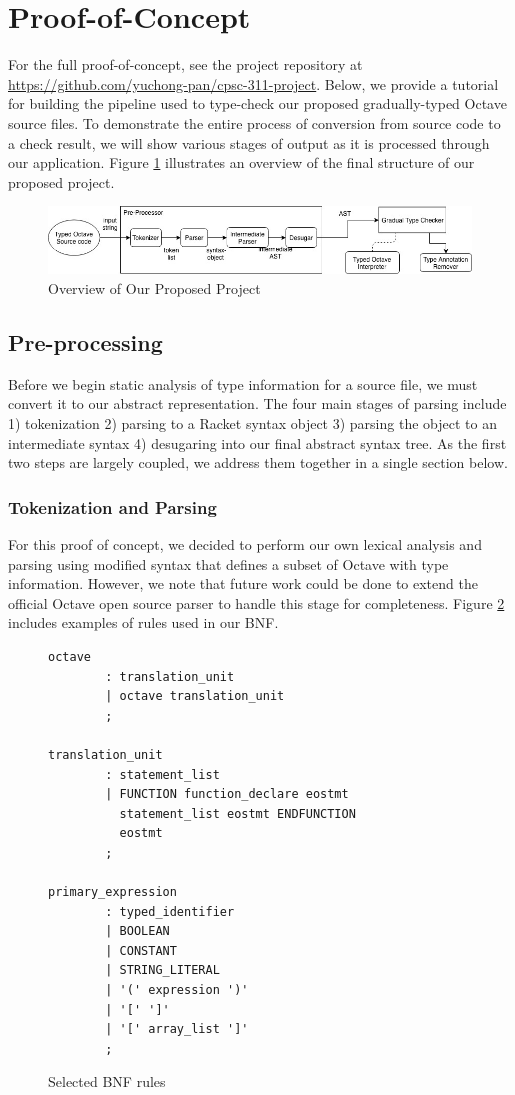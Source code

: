 \section{Proof-of-Concept}
For the full proof-of-concept, see the project repository at \url{https://github.com/yuchong-pan/cpsc-311-project}. Below, we provide a tutorial for building the pipeline used to type-check our proposed gradually-typed Octave source files. To demonstrate the entire process of conversion from source code to a check result, we will show various stages of output as it is processed through our application. Figure \ref{fig:overview} illustrates an overview of the final structure of our proposed project.

\begin{figure}[h]
    \centering
    \includegraphics[width=.5\textwidth]{overview.jpg}
    \caption{Overview of Our Proposed Project}
    \label{fig:overview}
\end{figure}

\subsection{Pre-processing}
Before we begin static analysis of type information for a source file, we must convert it to our abstract representation. The four main stages of parsing include 1) tokenization 2) parsing to a Racket syntax object 3) parsing the object to an intermediate syntax 4) desugaring into our final abstract syntax tree. As the first two steps are largely coupled, we address them together in a single section below.

\subsubsection{Tokenization and Parsing}
For this proof of concept, we decided to perform our own lexical analysis and parsing using modified syntax that defines a subset of Octave with type information. However, we note that future work could be done to extend the official Octave open source parser \cite{johneaton2018octaveparser} to handle this stage for completeness. Figure \ref{fig:bnf} includes examples of rules used in our BNF.

\begin{figure}[h]
    \begin{lstlisting}
octave
        : translation_unit
        | octave translation_unit
        ;

translation_unit
        : statement_list
        | FUNCTION function_declare eostmt
          statement_list eostmt ENDFUNCTION
          eostmt
        ;

primary_expression
        : typed_identifier
        | BOOLEAN
        | CONSTANT
        | STRING_LITERAL
        | '(' expression ')'
        | '[' ']'
        | '[' array_list ']'
        ;
    \end{lstlisting}
    \caption[]{Selected BNF rules}
    \label{fig:bnf}
\end{figure}

